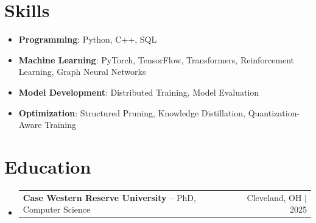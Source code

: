 \documentclass[letterpaper,13pt]{article}
\makeatletter
\newcommand{\resumeProjectHeading}[2]{
    \item
    \begin{tabular*}{\textwidth}{l@{\extracolsep{\fill}}r}
      \small#1 & #2 \\
    \end{tabular*}\vspace{-4pt}
}
\newcommand{\resumeSubHeadingListStart}{\begin{itemize}[leftmargin=0in, label={}]}
\newcommand{\resumeSubHeadingListEnd}{\end{itemize}}
\makeatother
\begin{document}
\section{Skills}
\vspace{0.02cm}
\begin{itemize}[leftmargin=0.15in, label={}, itemsep=2pt, topsep=1pt]
  \item \textbf{Programming}: Python, C++, SQL
  \item \textbf{Machine Learning}: PyTorch, TensorFlow, Transformers, Reinforcement Learning, Graph Neural Networks
  \item \textbf{Model Development}: Distributed Training, Model Evaluation
  \item \textbf{Optimization}: Structured Pruning, Knowledge Distillation, Quantization-Aware Training
\end{itemize}
\vspace{0.02cm}

\section{Education}
\resumeSubHeadingListStart
  \resumeProjectHeading{\textbf{Case Western Reserve University} -- PhD, Computer Science}{Cleveland, OH $|$ 2025}
\resumeSubHeadingListEnd
\end{document}
